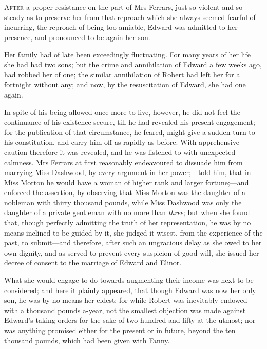 \chapter[Chapter \thechapter]{}
\lettrine[lraise=0.3]{A}{fter} a proper resistance on the part of Mrs Ferrars, just so violent and so steady as to preserve her from that reproach which she always seemed fearful of incurring, the reproach of being too amiable, Edward was admitted to her presence, and pronounced to be again her son.

Her family had of late been exceedingly fluctuating. For many years of her life she had had two sons; but the crime and annihilation of Edward a few weeks ago, had robbed her of one; the similar annihilation of Robert had left her for a fortnight without any; and now, by the resuscitation of Edward, she had one again.

In spite of his being allowed once more to live, however, he did not feel the continuance of his existence secure, till he had revealed his present engagement; for the publication of that circumstance, he feared, might give a sudden turn to his constitution, and carry him off as rapidly as before. With apprehensive caution therefore it was revealed, and he was listened to with unexpected calmness. Mrs Ferrars at first reasonably endeavoured to dissuade him from marrying Miss Dashwood, by every argument in her power;—told him, that in Miss Morton he would have a woman of higher rank and larger fortune;—and enforced the assertion, by observing that Miss Morton was the daughter of a nobleman with thirty thousand pounds, while Miss Dashwood was only the daughter of a private gentleman with no more than \textit{three}; but when she found that, though perfectly admitting the truth of her representation, he was by no means inclined to be guided by it, she judged it wisest, from the experience of the past, to submit—and therefore, after such an ungracious delay as she owed to her own dignity, and as served to prevent every suspicion of good-will, she issued her decree of consent to the marriage of Edward and Elinor.

What she would engage to do towards augmenting their income was next to be considered; and here it plainly appeared, that though Edward was now her only son, he was by no means her eldest; for while Robert was inevitably endowed with a thousand pounds a-year, not the smallest objection was made against Edward's taking orders for the sake of two hundred and fifty at the utmost; nor was anything promised either for the present or in future, beyond the ten thousand pounds, which had been given with Fanny.

